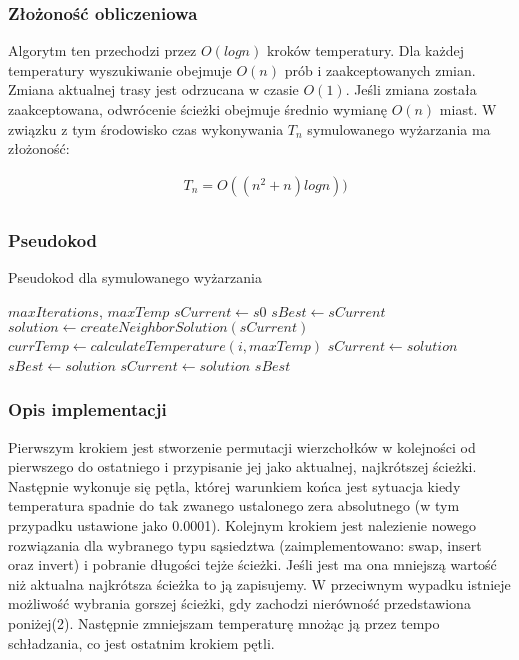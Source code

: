 \documentclass[12pt,a4paper,titlepage]{article}
\begin{document}
\subsubsection{Złożoność obliczeniowa}
Algorytm ten przechodzi przez $O(log n)$ kroków temperatury. Dla każdej temperatury wyszukiwanie obejmuje $O(n)$ prób i zaakceptowanych zmian. Zmiana aktualnej trasy jest odrzucana w czasie $O(1)$. Jeśli zmiana została zaakceptowana, odwrócenie ścieżki obejmuje średnio wymianę $O(n)$ miast. W związku z tym środowisko czas wykonywania $T_{n}$ symulowanego wyżarzania ma złożoność:
\begin{myequation}[H]
\begin{equation}
    \begin{split}
    &T_{n} =O((n^2 + n)log n)) \\
    \end{split}
\end{equation}
\end{myequation}

\subsubsection{Pseudokod}
\begin{algorithm}[H]
\caption{Pseudokod dla symulowanego wyżarzania\cite{cleveralgorithms}}
\begin{algorithmic}
\Require $maxIterations$, $maxTemp$
\State $sCurrent \gets s0$
\State $sBest \gets sCurrent$
\State $solution \gets createNeighborSolution(sCurrent)$
\State $currTemp \gets calculateTemperature(i, maxTemp)$
\State $sCurrent \gets solution$
\State $sBest \gets solution$
\EndIf
{}
\State $sCurrent \gets solution$
\EndIf
\EndFor
\State \Return $sBest$
\end{algorithmic}
\end{algorithm}

\subsubsection{Opis implementacji}
Pierwszym krokiem jest stworzenie permutacji wierzchołków w kolejności od pierwszego do ostatniego i przypisanie jej jako aktualnej, najkrótszej ścieżki. Następnie wykonuje się pętla, której warunkiem końca jest sytuacja kiedy temperatura spadnie do tak zwanego ustalonego zera absolutnego (w tym przypadku ustawione jako 0.0001). Kolejnym krokiem jest nalezienie nowego rozwiązania dla wybranego typu sąsiedztwa (zaimplementowano: swap, insert oraz invert) i pobranie długości tejże ścieżki. Jeśli jest ma ona mniejszą wartość niż aktualna najkrótsza ścieżka to ją zapisujemy. W przeciwnym wypadku istnieje możliwość wybrania gorszej ścieżki, gdy zachodzi nierówność przedstawiona poniżej(2). Następnie zmniejszam temperaturę mnożąc ją przez tempo schładzania, co jest ostatnim krokiem pętli.
\end{document}
